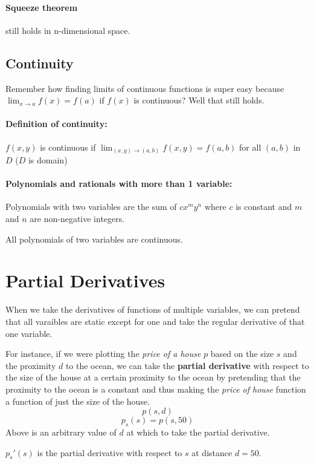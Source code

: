 \documentclass[a4paper,12pt]{report}
\begin{document}
\paragraph{Squeeze theorem } still holds in n-dimensional space. 

\subsection{Continuity}
Remember how finding limits of continuous functions is super easy because $\lim_{x\to a} f(x) = f(a)$ if $f(x)$ is continuous? Well that still holds.

\paragraph{Definition of continuity: }

$f(x, y)$ is continuous if $\lim_{(x, y) \to (a, b)} f(x, y) = f(a, b)$ for all $(a, b)$ in $D$ ($D$ is domain)

\paragraph{Polynomials and rationals with more than 1 variable: }

Polynomials with two variables are the sum of $cx^my^n$ where $c$ is constant and $m$ and $n$ are non-negative integers.

All polynomials of two variables are continuous. 


\section{Partial Derivatives}

When we take the derivatives of functions of multiple variables, we can pretend that all varaibles are static except for one and take the regular derivative of that one variable.

For instance, if we were plotting the \textit{price of a house} $p$ based on the size $s$ and the proximity $d$ to the ocean, we can take the \textbf{partial derivative} with respect to the size of the house at a certain proximity to the ocean by pretending that the proximity to the ocean is a constant and thus making the \textit{price of house} function a function of just the size of the house. 
$$p(s, d)$$
$$p_s(s) = p(s, 50)$$
Above is an arbitrary value of $d$ at which to take the partial derivative.

$p_s'(s)$ is the partial derivative with respect to $s$ at distance $d=50$.
\end{document}
